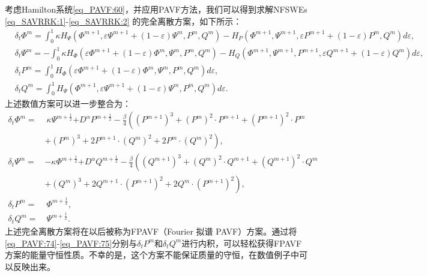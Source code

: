 考虑Hamilton系统\eqref{eq_PAVF:60}，并应用PAVF方法，我们可以得到求解NFSWEs \eqref{eq_SAVRRK:1}-\eqref{eq_SAVRRK:2} 的完全离散方案，如下所示：
\begin{align}
&\delta_{t} \varPhi^{m}=\int_{0}^{1}\kappa H_{\Psi}\left(\varPhi^{m+1}, \varepsilon \Psi^{m+1}+(1-\varepsilon) \Psi^{m}, P^{m}, Q^{m}\right)-H_{P}\left(\varPhi^{m+1}, \Psi^{m+1}, \varepsilon P^{m+1}+(1-\varepsilon) P^{m}, Q^{m}\right)d \varepsilon,\label{eq_PAVF:70}\\
&\delta_{t} \Psi^{m}=-\int_{0}^{1}\kappa H_{\varPhi}\left(\varepsilon \varPhi^{m+1}+(1-\varepsilon) \varPhi^{m}, \Psi^{m}, P^{m}, Q^{m}\right)-H_{Q}\left(\varPhi^{m+1}, \Psi^{m+1}, P^{m+1}, \varepsilon Q^{m+1}+(1-\varepsilon) Q^{m}\right)d\varepsilon,\label{eq_PAVF:71}\\
&\delta_{t} P^{m}=\int_{0}^{1}H_{\varPhi}\left(\varepsilon \varPhi^{m+1}+(1-\varepsilon) \varPhi^{m}, \Psi^{m}, P^{m}, Q^{m}\right) d \varepsilon,\label{eq_PAVF:72}\\
&\delta_{t} Q^{m}=\int_{0}^{1}H_{\Psi}\left(\varPhi^{m+1}, \varepsilon \Psi^{m+1}+(1-\varepsilon) \Psi^{m}, P^{m}, Q^{m}\right) d \varepsilon.\label{eq_PAVF:73}
\end{align}
上述数值方案可以进一步整合为：
\begin{align}
\delta_{t} \varPhi^{m}=&~\kappa \Psi^{m+\frac{1}{2}}{+D^{\alpha} P^{m+\frac{1}{2}}}-\frac{\beta}{4}\left( (P^{m+1})^3+ (P^{m})^{2}\cdot P^{m+1}+(P^{m+1})^{2}\cdot P^{m}\right.\nonumber\\
	&+\left. (P^{m})^{3}+2 P^{m+1}\cdot (Q^{m})^{2}+2 P^{m}\cdot (Q^{m})^{2}\right),\label{eq_PAVF:74}\\
\delta_{t} \Psi^{m}=&-\kappa \varPhi^{m+\frac{1}{2}}{+D^{\alpha} Q^{m+\frac{1}{2}}}-\frac{\beta}{4}\left( (Q^{m+1})^3+ (Q^{m})^{2}\cdot Q^{m+1}+(Q^{m+1})^{2}\cdot Q^{m}\right.\nonumber\\
	&+\left. (Q^{m})^{3}+2 Q^{m+1}\cdot (P^{m+1})^{2}+2 Q^{m}\cdot (P^{m+1})^{2}\right),\label{eq_PAVF:75}\\
\delta_{t} P^{m}=&~\varPhi^{m+\frac{1}{2}},\label{eq_PAVF:76}\\
\delta_{t} Q^{m}=&~\Psi^{m+\frac{1}{2}}.\label{eq_PAVF:77}
\end{align}
上述完全离散方案将在以后被称为FPAVF（Fourier 拟谱 PAVF）方案。通过将\eqref{eq_PAVF:74}-\eqref{eq_PAVF:75}分别与$\delta_t P^{m}$和$\delta_t Q^{m}$进行内积，可以轻松获得FPAVF方案的能量守恒性质。不幸的是，这个方案不能保证质量的守恒，在数值例子中可以反映出来。

